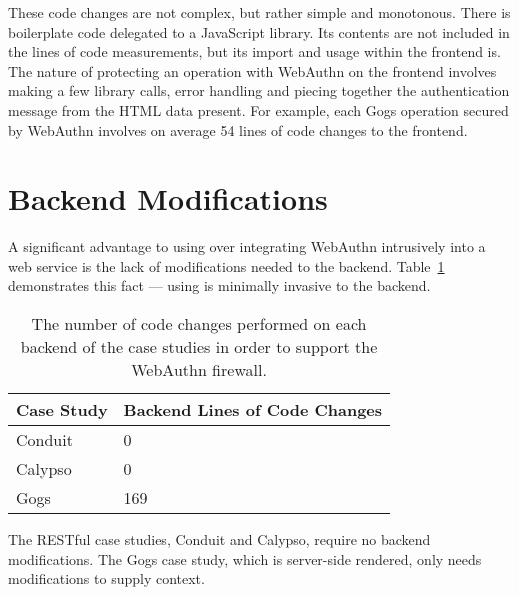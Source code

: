 These code changes are not complex, but rather simple and monotonous. There is boilerplate code delegated to a JavaScript library. Its contents are not included in the lines of code measurements, but its import and usage within the frontend is. The nature of protecting an operation with WebAuthn on the frontend involves making a few library calls, error handling and piecing together the authentication message from the HTML data present. For example, each Gogs operation secured by WebAuthn involves on average 54 lines of code changes to the frontend. 




\section{Backend Modifications}\label{Sec:BackendModifications}

A significant advantage to using \sys{} over integrating WebAuthn intrusively into a web service is the lack of modifications needed to the backend. Table~\ref{Table:EvaluationsBackendModifications} demonstrates this fact --- using \sys{} is minimally invasive to the backend.

\begin{table}[h]
\centering

\begin{tabular}{ m{4.5cm} m{6cm}  } 
 \hline
 Case Study & Backend Lines of Code Changes \\ 
 \hline \hline

 Conduit & 0 \\ \hline

 Calypso & 0 \\ \hline

 Gogs & 169 \\ \hline

\end{tabular}
\caption{The number of code changes performed on each backend of the case studies in order to support the WebAuthn firewall.}
\label{Table:EvaluationsBackendModifications}
\end{table}

The RESTful case studies, Conduit and Calypso, require no backend modifications. The Gogs case study, which is server-side rendered, only needs modifications to supply context. 

